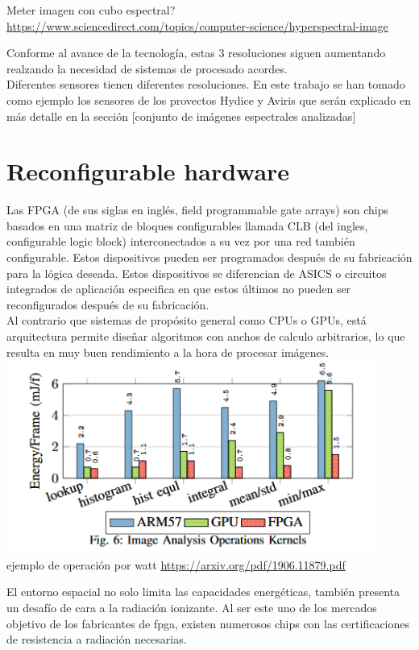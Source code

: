 \bigskip
Meter imagen con cubo espectral?
\url{https://www.sciencedirect.com/topics/computer-science/hyperspectral-image}

\bigskip
Conforme al avance de la tecnología, estas 3 resoluciones siguen aumentando realzando la necesidad de sistemas de procesado acordes.
\\
Diferentes sensores tienen diferentes resoluciones. En este trabajo se han tomado como ejemplo los sensores de los provectos Hydice y Aviris que serán explicado en más detalle en la sección [conjunto de imágenes espectrales analizadas]


\section{Reconfigurable hardware}

Las FPGA (de sus siglas en inglés, field programmable gate arrays) son chips basados en una matriz de bloques configurables llamada CLB (del ingles, configurable logic block) interconectados a su vez por una red también configurable. Estos dispositivos pueden ser programados después de su fabricación para la lógica deseada. Estos dispositivos se diferencian de ASICS o circuitos integrados de aplicación especifica en que estos últimos no pueden ser reconfigurados después de su fabricación.
\\
Al contrario que sistemas de propósito general como CPUs o GPUs, está arquitectura permite diseñar algoritmos con anchos de calculo arbitrarios, lo que resulta en muy buen rendimiento a la hora de procesar imágenes.
\\
\includegraphics[height=2.5in]{figures/op_watt.png}
ejemplo de operación por watt
\url{https://arxiv.org/pdf/1906.11879.pdf}

El entorno espacial no solo limita las capacidades energéticas, también presenta un desafío de cara a la radiación ionizante. Al ser este uno de los mercados objetivo de los fabricantes de fpga, existen numerosos chips con las certificaciones de resistencia a radiación necesarias.

